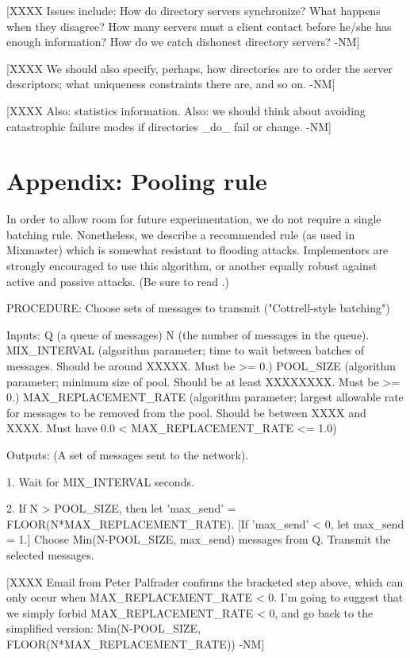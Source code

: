 [XXXX Issues include:  How do directory servers synchronize?
   What happens when they disagree?  How many servers must a client
   contact before he/she has enough information?  How do we catch
   dishonest directory servers? -NM]

[XXXX We should also specify, perhaps, how directories are to order
   the server descriptors; what uniqueness constraints there are, and so
   on. -NM]

[XXXX Also: statistics information. Also: we should think about
   avoiding catastrophic failure modes if directories _do_ fail or
   change. -NM]

\section{Appendix: Pooling rule}

In order to allow room for future experimentation, we do not require a
single batching rule.  Nonetheless, we describe a recommended rule (as
used in Mixmaster) which is somewhat resistant to flooding attacks.
Implementors are strongly encouraged to use this algorithm, or another
equally robust against active and passive attacks.  (Be sure to read
\cite{batching-taxonomy}.)

PROCEDURE: Choose sets of messages to transmit ("Cottrell-style batching")

Inputs: Q (a queue of messages)
        N (the number of messages in the queue).
	MIX_INTERVAL (algorithm parameter; time to wait between
                      batches of messages.  Should be around
                      XXXXX. Must be >= 0.)
        POOL_SIZE (algorithm parameter; minimum size of pool.  Should
                   be at least XXXXXXXX.  Must be >= 0.)
        MAX_REPLACEMENT_RATE (algorithm parameter; largest allowable
                   rate for messages to be removed from the
                   pool. Should be between XXXX and XXXX.  Must have
                   0.0 < MAX_REPLACEMENT_RATE <= 1.0)

Outputs: (A set of messages sent to the network).

1. Wait for MIX_INTERVAL seconds.

2. If N > POOL_SIZE, then let 'max_send' = FLOOR(N*MAX_REPLACEMENT_RATE).
   [If 'max_send' < 0, let max_send = 1.]  Choose Min(N-POOL_SIZE, max_send)
   messages from Q.  Transmit the selected messages.

[XXXX Email from Peter Palfrader confirms the bracketed step above,
 which can only occur when MAX_REPLACEMENT_RATE < 0.  I'm going to
 suggest that we simply forbid MAX_REPLACEMENT_RATE < 0, and go back
 to the simplified version:
     Min(N-POOL_SIZE, FLOOR(N*MAX_REPLACEMENT_RATE)) -NM]

